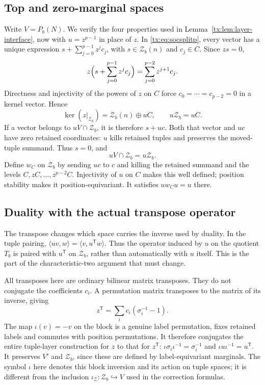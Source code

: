 \subsection{Top and zero-marginal spaces}
Write $V=P_b(N)$. We verify the four properties used in
Lemma~\ref{tx:lem:layer-interface}, now with $u=z^{p-1}$ in place of
$z$. In \eqref{tx:eq:socsplitp}, every vector has a unique expression
$s+\sum_{j=0}^{p-1}z^jc_j$, with $s\in\mathcal Z_b(n)$ and
$c_j\in C$. Since $zs=0$,
\[
 z\Bigl(s+\sum_{j=0}^{p-1}z^jc_j\Bigr)
                         =\sum_{j=0}^{p-2}z^{j+1}c_j.
\]
Directness and injectivity of the powers of $z$ on $C$ force
$c_0=\cdots=c_{p-2}=0$ in a kernel vector. Hence
\[
 \ker(z|_{\mathcal Z_b})=\mathcal Z_b(n)\oplus uC,
                         \qquad u\mathcal Z_b=uC.
\]
If a vector belongs to $uV\cap\mathcal Z_b$, it is therefore $s+uc$.
Both that vector and $uc$ have zero retained coordinates: $u$ kills
retained tuples and preserves the moved-tuple summand. Thus $s=0$, and
\[
                         uV\cap\mathcal Z_b=u\mathcal Z_b.
\]
Define $w_C$ on $\mathcal Z_b$ by sending $uc$ to $c$ and killing
the retained summand and the levels $C,zC,\ldots,z^{p-2}C$.
Injectivity of $u$ on $C$ makes this well defined; position stability
makes it position-equivariant. It satisfies $uw_Cu=u$ there.

\subsection{Duality with the actual transpose operator}
The transpose changes which space carries the inverse used by
duality. In the tuple pairing, $\langle uv,w\rangle
=\langle v,u^{\mathsf T}w\rangle$. Thus the operator induced by
$u$ on the quotient $T_b$ is paired with $u^{\mathsf T}$ on
$\mathcal Z_b$, rather than automatically with $u$ itself.
This is the part of the characteristic-two argument that must change.

All transposes here are ordinary bilinear matrix transposes. They do
not conjugate the coefficients $c_i$. A permutation matrix transposes
to the matrix of its inverse, giving
\[
 z^{\mathsf T}=\sum_i c_i(\sigma_i^{-1}-1).
\]
The map
$\iota(v)=-v$ on the block is a genuine label permutation, fixes
retained labels and commutes with position permutations. It therefore
conjugates the entire tuple-layer construction for $z$ to that for
$z^{\mathsf T}$: $\iota\sigma_i\iota^{-1}=\sigma_i^{-1}$ and
$\iota u\iota^{-1}=u^{\mathsf T}$. It preserves $V'$ and
$\mathcal Z_b$, since these are defined by label-equivariant marginals.
The symbol $\iota$ here denotes this block inversion and its action
on tuple spaces; it is different from the inclusion
$\iota_{\mathcal Z}:\mathcal Z_b\hookrightarrow V$ used in the
correction formulas.

